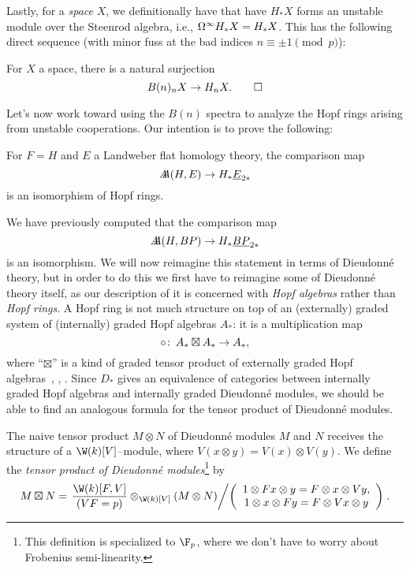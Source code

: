 Lastly, for a \emph{space} $X$, we definitionally have that have $H_* X$ forms an unstable module over the Steenrod algebra, i.e., $\Omega^\infty H_* X = H_* X$.  This has the following direct sequence (with minor fuss at the bad indices $n \equiv \pm 1 \pmod p$):

\begin{lemma}
For $X$ a space, there is a natural surjection \[B(n)_n X \to H_n X. \qed\]
\end{lemma}



Let's now work toward using the $B(n)$ spectra to analyze the Hopf rings arising from unstable cooperations.  Our intention is to prove the following:
\begin{theorem}
For $F = H$ and $E$ a Landweber flat homology theory, the comparison map \[A\!\!\!A(H, E) \to H_* \underline{\smash{E}}_{2*}\] is an isomorphism of Hopf rings.
\end{theorem}
\noindent We have previously computed that the comparison map \[A\!\!\!A(H, BP) \to H_* \underline{\smash{BP}}_{2*}\] is an isomorphism.  We will now reimagine this statement in terms of Dieudonn\'e theory, but in order to do this we first have to reimagine some of Dieudonn\'e theory itself, as our description of it is concerned with \emph{Hopf algebras} rather than \emph{Hopf rings}.  A Hopf ring is not much structure on top of an (externally) graded system of (internally) graded Hopf algebras $A_*$: it is a multiplication map \[\circ\colon\thinspace A_* \boxtimes A_* \to A_*,\] where ``$\boxtimes$'' is a kind of graded tensor product of externally graded Hopf algebras~\cite[Proposition 2.6]{HuntonTurner}, \cite[Definition 2.2]{BuchstaberLazarev}, \cite[Section 5]{GoerssDieudonne}.  Since $D_*$ gives an equivalence of categories between internally graded Hopf algebras and internally graded Dieudonn\'e modules, we should be able to find an analogous formula for the tensor product of Dieudonn\'e modules.

\begin{definition}{\cite[pg.\ 154]{GoerssDieudonne}}
The naive tensor product $M \otimes N$ of Dieudonn\'e modules $M$ and $N$ receives the structure of a $\W(k)[V]$--module, where $V(x \otimes y) = V(x) \otimes V(y)$.  We define the \textit{tensor product of Dieudonn\'e modules}\footnote{This definition is specialized to $\F_p$, where we don't have to worry about Frobenius semi-linearity.} by \[M \boxtimes N = \left.\frac{\W(k)[F, V]}{(VF = p)} \otimes_{\W(k)[V]} (M \otimes N) \middle/ \left( \begin{array}{c} 1 \otimes Fx \otimes y = F \otimes x \otimes Vy, \\ 1 \otimes x \otimes Fy = F \otimes Vx \otimes y \end{array} \right) \right. .\]
\end{definition}

